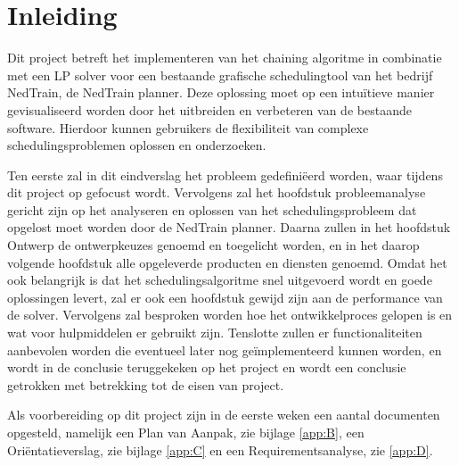 \section{Inleiding}
Dit project betreft het implementeren van het chaining algoritme in combinatie met een LP solver voor een bestaande grafische schedulingtool van het bedrijf NedTrain, de NedTrain planner. Deze oplossing moet op een intu\"itieve manier gevisualiseerd worden door het uitbreiden en verbeteren van de bestaande software. Hierdoor kunnen gebruikers de flexibiliteit van complexe schedulingsproblemen oplossen en onderzoeken.

Ten eerste zal in dit eindverslag het probleem gedefini\"eerd worden, waar tijdens dit project op gefocust wordt. Vervolgens zal het hoofdstuk probleemanalyse gericht zijn op het analyseren en oplossen van het schedulingsprobleem dat opgelost moet worden door de NedTrain planner. Daarna zullen in het hoofdstuk Ontwerp de ontwerpkeuzes genoemd en toegelicht worden, en in het daarop volgende hoofdstuk alle opgeleverde producten en diensten genoemd. Omdat het ook belangrijk is dat het schedulingsalgoritme snel uitgevoerd wordt en goede oplossingen levert, zal er ook een hoofdstuk gewijd zijn aan de performance van de solver. Vervolgens zal besproken worden hoe het ontwikkelproces gelopen is en wat voor hulpmiddelen er gebruikt zijn. Tenslotte zullen er functionaliteiten aanbevolen worden die eventueel later nog ge\"implementeerd kunnen worden, en wordt in de conclusie teruggekeken op het project en wordt een conclusie getrokken met betrekking tot de eisen van project.

Als voorbereiding op dit project zijn in de eerste weken een aantal documenten opgesteld, namelijk een Plan van Aanpak, zie bijlage \ref{app:B}, een Ori\"entatieverslag, zie bijlage \ref{app:C} en een Requirementsanalyse, zie \ref{app:D}.